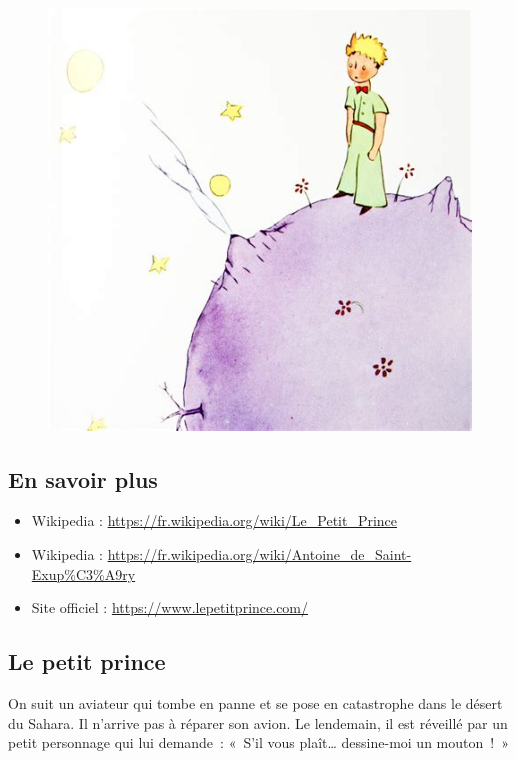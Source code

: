 \documentclass[12pt]{article}
\begin{document}
\begin{multicols}{2}

  \begin{figure}[H]
        \centering
        \includegraphics[width=0.9\linewidth]{3x2-calcul-litteral-1/sources/dm-pp.png}
  \end{figure}
\subsection*{En savoir plus}

\begin{itemize}
  \item Wikipedia : \url{https://fr.wikipedia.org/wiki/Le_Petit_Prince}
  \item Wikipedia : \url{https://fr.wikipedia.org/wiki/Antoine_de_Saint-Exup%C3%A9ry}
  \item Site officiel : \url{https://www.lepetitprince.com/}
\end{itemize}


\subsection*{Le petit prince}

On suit un aviateur qui tombe en panne et se pose en catastrophe dans le désert du Sahara. Il n’arrive pas à réparer son avion.
Le lendemain, il est réveillé par un petit personnage qui lui demande : « S'il vous plaît… dessine-moi un mouton ! » 

\end{multicols}
\newpage
\end{document}

